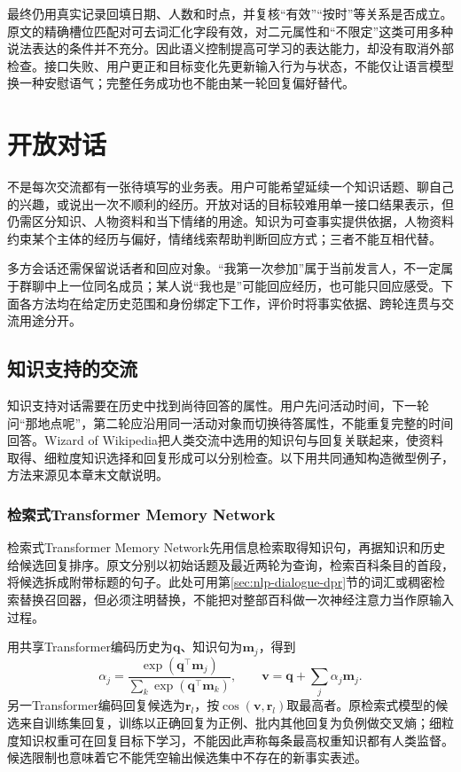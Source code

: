最终仍用真实记录回填日期、人数和时点，并复核“有效”“按时”等关系是否成立。原文的精确槽位匹配对可去词汇化字段有效，对二元属性和“不限定”这类可用多种说法表达的条件并不充分。因此语义控制提高可学习的表达能力，却没有取消外部检查。接口失败、用户更正和目标变化先更新输入行为与状态，不能仅让语言模型换一种安慰语气；完整任务成功也不能由某一轮回复偏好替代。

\section{开放对话}
\label{sec:nlp-dialogue-open}

不是每次交流都有一张待填写的业务表。用户可能希望延续一个知识话题、聊自己的兴趣，或说出一次不顺利的经历。开放对话的目标较难用单一接口结果表示，但仍需区分知识、人物资料和当下情绪的用途。知识为可查事实提供依据，人物资料约束某个主体的经历与偏好，情绪线索帮助判断回应方式；三者不能互相代替。

多方会话还需保留说话者和回应对象。“我第一次参加”属于当前发言人，不一定属于群聊中上一位同名成员；某人说“我也是”可能回应经历，也可能只回应感受。下面各方法均在给定历史范围和身份绑定下工作，评价时将事实依据、跨轮连贯与交流用途分开。

\subsection{知识支持的交流}
\label{sec:nlp-dialogue-knowledge}

知识支持对话需要在历史中找到尚待回答的属性。用户先问活动时间，下一轮问“那地点呢”，第二轮应沿用同一活动对象而切换待答属性，不能重复完整的时间回答。Wizard of Wikipedia把人类交流中选用的知识句与回复关联起来，使资料取得、细粒度知识选择和回复形成可以分别检查。以下用共同通知构造微型例子，方法来源见本章末文献说明。

\subsubsection{检索式Transformer Memory Network}
\label{sec:nlp-dialogue-retrieval-memory}

检索式Transformer Memory Network先用信息检索取得知识句，再据知识和历史给候选回复排序。原文分别以初始话题及最近两轮为查询，检索百科条目的首段，将候选拆成附带标题的句子。此处可用第\ref{sec:nlp-dialogue-dpr}节的词汇或稠密检索替换召回器，但必须注明替换，不能把对整部百科做一次神经注意力当作原输入过程。

用共享Transformer编码历史为$\bm{q}$、知识句为$\bm{m}_j$，得到
\begin{equation}
 \alpha_j=\frac{\exp(\bm{q}^{\top}\bm{m}_j)}
                  {\sum_k\exp(\bm{q}^{\top}\bm{m}_k)},
 \qquad
 \bm{v}=\bm{q}+\sum_j\alpha_j\bm{m}_j.
 \label{eq:nlp-dialogue-retrieval-memory}
\end{equation}
另一Transformer编码回复候选为$\bm{r}_l$，按$\cos(\bm{v},\bm{r}_l)$取最高者。原检索式模型的候选来自训练集回复，训练以正确回复为正例、批内其他回复为负例做交叉熵；细粒度知识权重可在回复目标下学习，不能因此声称每条最高权重知识都有人类监督。候选限制也意味着它不能凭空输出候选集中不存在的新事实表述。

